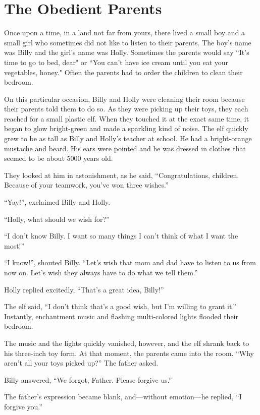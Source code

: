 \chapter{The Obedient Parents}
\setlength{\parindent}{2em}
\LARGE
{}\baselineskip

Once upon a time, in a land not far from yours, there lived a small boy and a small girl who sometimes did not like to listen to their parents. The boy's name was Billy and the girl's name was Holly. Sometimes the parents would say “It's time to go to bed, dear" or “You can't have ice cream until you eat your vegetables, honey." Often the parents had to order the children to clean their bedroom.

On this particular occasion, Billy and Holly were cleaning their room because their parents told them to do so. As they were picking up their toys, they each reached for a small plastic elf. When they touched it at the exact same time, it began to glow bright-green and made a sparkling kind of noise. The elf quickly grew to be as tall as Billy and Holly's teacher at school. He had a bright-orange mustache and beard. His ears were pointed and he was dressed in clothes that seemed to be about 5000 years old.

They looked at him in astonishment, as he said, “Congratulations, children. Because of your teamwork, you've won three wishes.”

“Yay!”, exclaimed Billy and Holly.

“Holly, what should we wish for?”

“I don't know Billy. I want so many things I can't think of what I want the most!”

“I know!”, shouted Billy. “Let's wish that mom and dad have to listen to us from now on. Let's wish they always have to do what we tell them.”

Holly replied excitedly, “That's a great idea, Billy!”

The elf said, “I don't think that's a good wish, but I'm willing to grant it.” Instantly, enchantment music and flashing multi-colored lights flooded their bedroom.

The music and the lights quickly vanished, however, and the elf shrank back to his three-inch toy form. At that moment, the parents came into the room. “Why aren't all your toys picked up?” The father asked.

Billy answered, “We forgot, Father. Please forgive us.”

The father's expression became blank, and—without emotion—he replied, “I forgive you.”

